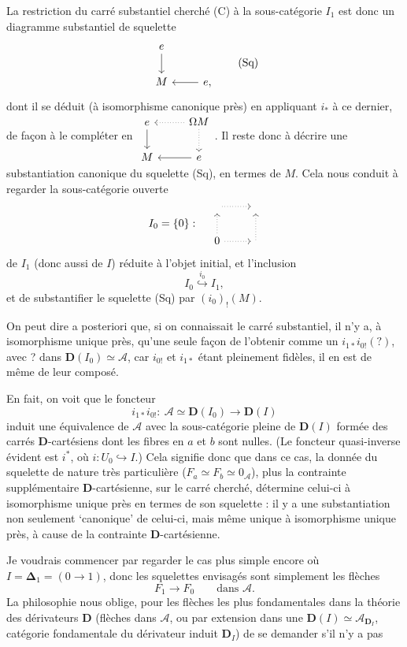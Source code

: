 \documentclass[11pt]{article}
\newcommand{\printedpage}[1]{\marginpar{\footnotesize p.~#1}}
\newcommand{\msp}[1]{\marginpar{\footnotesize [#1]}}
\newcommand{\D}{\mathbf{D}}
\newcommand{\cA}{\mathcal{A}}
\newcommand{\bDelta}{\boldsymbol{\Delta}}
\begin{document}
\msp{page 76}

La restriction du carré substantiel cherché (C) à la sous-catégorie $I_1$ est donc un diagramme substantiel de squelette
\[
\begin{tikzcd}
e \arrow[d] \\
M & e, \arrow[l]
\end{tikzcd}
\tag*{(Sq)}
\]
\printedpage{3}
dont il se déduit (à isomorphisme canonique près) en appliquant $i_*$ à ce dernier, de façon à le compléter en $\begin{tikzcd}
e \arrow[d] & \Omega M \arrow[l, dotted] \arrow[d, dotted] \\
M & e \arrow[l]
\end{tikzcd}$. Il reste donc à décrire une substantiation canonique du squelette (Sq), en termes de $M$. Cela nous conduit à regarder la sous-catégorie ouverte
\[
I_0 = \{0\} :\quad
\begin{tikzcd}
{} \arrow[r, dotted] & {} \\
0 \arrow[u, dotted] \arrow[r, dotted] & {} \arrow[u, dotted]
\end{tikzcd}
\]
de $I_1$ (donc aussi de $I$) réduite à l'objet initial, et l'inclusion
\[
I_0 \overset{i_0}{\hookrightarrow} I_1,
\]
et de substantifier le squelette (Sq) par $(i_0)_!(M)$.

On peut dire a posteriori que, si on connaissait le carré substantiel, il n'y a, à isomorphisme unique près, qu'une seule façon de l'obtenir comme un $i_{1*}i_{0!}(?)$, avec ? dans $\D(I_0)\simeq\cA$, car $i_{0!}$ et $i_{1*}$ étant pleinement fidèles, il en est de même de leur composé.

\msp{page 77}

En fait, on voit que le foncteur
\[
i_{1*}i_{0!} :\ \cA\simeq\D(I_0) \longrightarrow \D(I)
\]
induit une équivalence de $\cA$ avec la sous-catégorie pleine de $\D(I)$ formée des carrés $\D$-cartésiens dont les fibres en $a$ et $b$ sont nulles. (Le foncteur quasi-inverse évident est $i^*$, où $i : U_0 \hookrightarrow I$.) Cela signifie donc que dans ce cas, la donnée du squelette de nature très particulière ($F_a\simeq F_b\simeq 0_{\cA}$), plus la contrainte supplémentaire $\D$-cartésienne, sur le carré cherché, détermine celui-ci à isomorphisme unique près en termes de son squelette : il y a une substantiation non seulement `canonique' de celui-ci, mais même unique à isomorphisme unique près, à cause de la contrainte $\D$-cartésienne.

Je voudrais commencer par regarder le cas plus simple encore où $I=\bDelta_1=(0\longrightarrow 1)$, donc les squelettes envisagés sont simplement les flèches
\[
F_1 \longrightarrow F_0 \qquad \text{dans } \cA.
\]
La philosophie nous oblige, pour les flèches les plus fondamentales dans la théorie des dérivateurs $\D$ (flèches dans $\cA$, ou par extension dans une $\D(I)\simeq\cA_{\D_I}$, catégorie fondamentale du dérivateur induit $\D_I$) de se demander s'il n'y a pas
\end{document}
